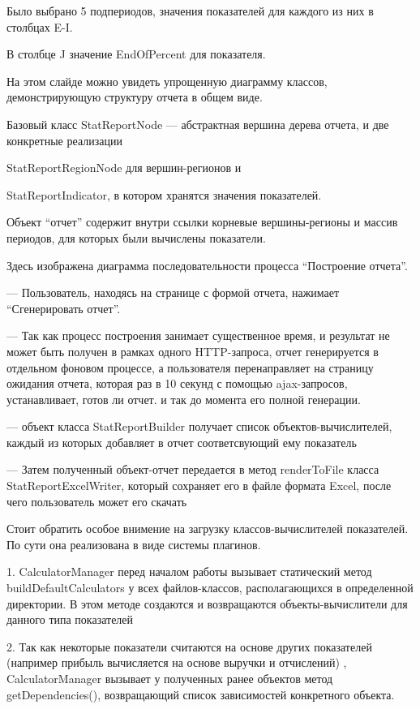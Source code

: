 \documentclass[a4paper]{article}
\begin{document}
Было выбрано 5 подпериодов, значения показателей для каждого из них в столбцах 
E-I.

В столбце J значение EndOfPercent для показателя.

\newpage

На этом слайде можно увидеть упрощенную диаграмму классов, демонстрирующую структуру отчета в общем виде.

Базовый класс StatReportNode --- абстрактная вершина дерева отчета,
и две конкретные реализации 

StatReportRegionNode для вершин-регионов и

StatReportIndicator, в котором хранятся значения показателей.

Объект “отчет” содержит внутри ссылки корневые вершины-регионы и массив периодов, для которых были вычислены показатели.

\newpage

Здесь изображена диаграмма последовательности процесса “Построение отчета”.

--- Пользователь, находясь на странице с формой отчета, нажимает “Сгенерировать отчет”.

--- Так как процесс построения занимает существенное время, и результат не может быть получен в рамках одного HTTP-запроса, 
отчет генерируется в отдельном фоновом процессе, а пользователя перенаправляет на страницу ожидания отчета, которая раз в 10 секунд с помощью ajax-запросов, устанавливает, готов ли отчет.
и так до момента его полной генерации.

--- объект класса StatReportBuilder получает список объектов-вычислителей, каждый из которых добавляет в отчет соответсвующий ему показатель

--- Затем полученный объект-отчет передается в метод renderToFile класса StatReportExcelWriter, который сохраняет его в файле формата Excel, после чего пользователь может его скачать

\newpage
Стоит обратить особое внимение на загрузку классов-вычислителей показателей. По сути она реализована в виде системы плагинов.

1. CalculatorManager перед началом работы вызывает статический метод buildDefaultCalculators у всех файлов-классов, располагающихся в определенной директории.
В этом методе создаются и возвращаются объекты-вычислители для данного типа показателей

2. Так как некоторые показатели считаются на основе других показателей
(например прибыль вычисляется на основе выручки и отчислений)
, CalculatorManager вызывает у полученных ранее объектов метод getDependencies(), возвращающий список зависимостей конкретного объекта.
\end{document}
